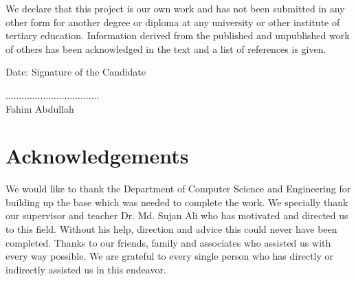 \documentclass[12pt,a4paper]{report}
\begin{document}
	
	\justify  We declare that this project is our own work and has not been submitted in any other form for another degree or diploma at any university or other institute of tertiary education. Information derived from the published and unpublished work of others has been acknowledged in the text and a list of references is given.\\
	\vspace{2cm}

	\justify
	Date:   	\hspace{8.2cm}					     	      Signature of the Candidate
	\begin{flushright}
		...................................\\
		Fahim Abdullah
	\end{flushright}	
	
	
	
	\newpage
	
	
	\renewcommand*\contentsname{CONTENTS\\\rule{15cm}{.06cm}}
	
	\tableofcontents
	
	
	\cleardoublepage
	
	\listoffigures
	
	\chapter*{\centering Acknowledgements}
	\justify   We would like to thank the Department of Computer Science and Engineering for building up the base which was needed to complete the work. We specially thank our supervisor and teacher Dr. Md. Sujan Ali who has motivated and directed us to this field. Without his help, direction and advice this could never have been completed. Thanks to our friends, family and associates who assisted us with every way possible. We are grateful to every single person who has directly or indirectly assisted us in this endeavor.\\ 
	
	
	
\end{document}
